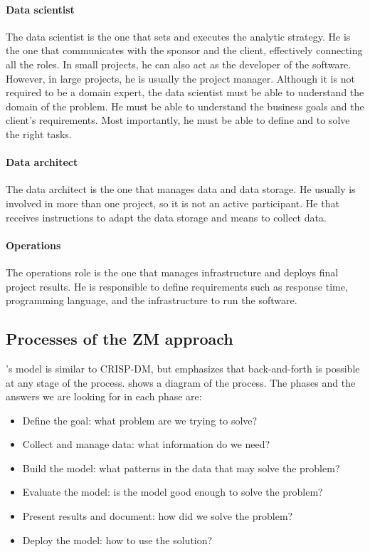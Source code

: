 \paragraph{Data scientist}  The data scientist is the one that sets and executes the
analytic strategy.  He is the one that communicates with the sponsor and the client,
effectively connecting all the roles.  In small projects, he can also act as the developer
of the software.  However, in large projects, he is usually the project manager.
Although it is not required to be a domain expert, the data scientist must be able to
understand the domain of the problem.  He must be able to understand the business goals and
the client's requirements.  Most importantly, he must be able to define and to solve the
right tasks.

\paragraph{Data architect}  The data architect is the one that manages data and data storage.
He usually is involved in more than one project, so it is not an active participant.  He
that receives instructions to adapt the data storage and means to collect data.

\paragraph{Operations}  The operations role is the one that manages infrastructure and
deploys final project results.  He is responsible to define requirements such as response
time, programming language, and the infrastructure to run the software.

\subsection{Processes of the ZM approach}

\citeauthor{Zumel2019}'s model is similar to CRISP-DM, but emphasizes that back-and-forth
is possible at any stage of the process.   shows a diagram of the process.
The phases and the answers we are looking for in each phase are:
\begin{itemize}
  \itemsep0em
  \item Define the goal: what problem are we trying to solve?
  \item Collect and manage data: what information do we need?
  \item Build the model: what patterns in the data that may solve the problem?
  \item Evaluate the model: is the model good enough to solve the problem?
  \item Present results and document: how did we solve the problem?
  \item Deploy the model: how to use the solution?
\end{itemize}


